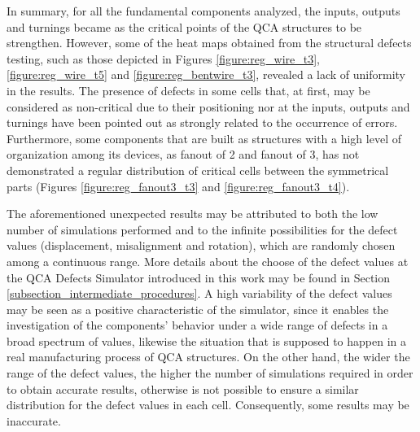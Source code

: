 In summary, for all the fundamental components analyzed, the inputs, outputs and turnings became as the critical points of the QCA structures to be strengthen. However, some of the heat maps obtained from the structural defects testing, such as those depicted in Figures \ref{figure:reg_wire_t3},  \ref{figure:reg_wire_t5} and \ref{figure:reg_bentwire_t3}, revealed a lack of uniformity in the results. The presence of defects in some cells that, at first, may be considered as non-critical due to their positioning \textemdash nor at the inputs, outputs and turnings \textemdash have been pointed out as strongly related to the occurrence of errors. Furthermore, some components that are built as structures with a high level of organization among its devices, as fanout of 2 and fanout of 3, has not demonstrated a regular distribution of critical cells between the symmetrical parts (Figures \ref{figure:reg_fanout3_t3} and \ref{figure:reg_fanout3_t4}).

The aforementioned unexpected results may be attributed to both the low number of simulations performed and to the infinite possibilities for the defect values (displacement, misalignment and rotation), which are randomly chosen among a continuous range. More details about the choose of the defect values at the QCA Defects Simulator introduced in this work may be found in Section \ref{subsection_intermediate_procedures}. A high variability of the defect values may be seen as a positive characteristic of the simulator, since it enables the investigation of the components' behavior under a wide range of defects in a broad spectrum of values, likewise the situation that is supposed to happen in a real manufacturing process of QCA structures. On the other hand, the wider the range of the defect values, the higher the number of simulations required in order to obtain accurate results, otherwise is not possible to ensure a similar distribution for the defect values in each cell. Consequently, some results may be inaccurate.

